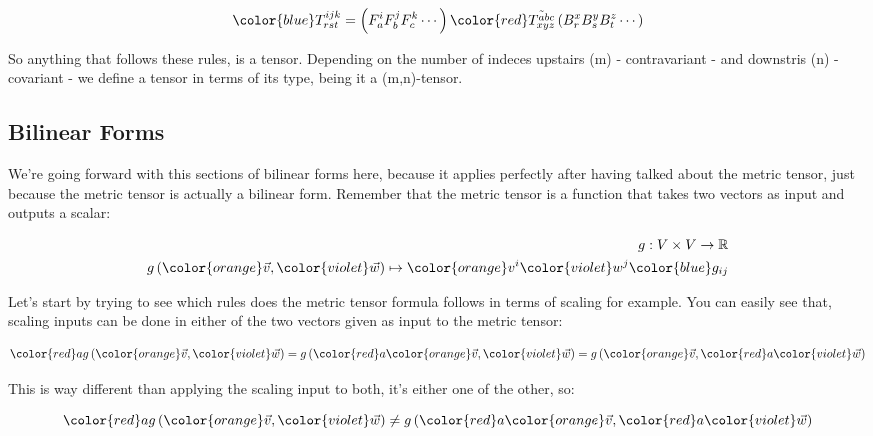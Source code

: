 \begin{equation}
    \begingroup\color{blue} T^{ijk}_{rst}\endgroup = \left(F^i_a F^j_b F^k_c \cdots\right)\begingroup\color{red}\tilde{T^{abc}_{xyz}}\endgroup \left(B^x_r B^y_s B^z_t \cdots\right)
\end{equation}

So anything that follows these rules, is a tensor.
Depending on the number of indeces upstairs (m) - contravariant - and downstris (n) - covariant - we define a tensor in terms of its type, 
being it a (m,n)-tensor.

\subsection{Bilinear Forms}

We're going forward with this sections of bilinear forms here, because it applies perfectly after having talked about the metric tensor, 
just because the metric tensor is actually a bilinear form.
Remember that the metric tensor is a function that takes two vectors as input and outputs a scalar:

\begin{align*}
    g: V \times V \to \mathbb{R}\\
    g \left(\begingroup\color{orange}\vec{v}\endgroup, \begingroup\color{violet}\vec{w}\endgroup\right) \mapsto  \begingroup\color{orange}v^i\endgroup \begingroup\color{violet}w^j\endgroup \begingroup\color{blue}g_{ij}\endgroup
\end{align*}

Let's start by trying to see which rules does the metric tensor formula follows in terms of scaling for example.
You can easily see that, scaling inputs can be done in either of the two vectors given as input to the metric tensor:

\begin{align*}
    \begingroup\color{red}a \endgroup g \left(\begingroup\color{orange}\vec{v}\endgroup, \begingroup\color{violet}\vec{w}\endgroup\right)
    = g \left(\begingroup\color{red}a \endgroup\begingroup\color{orange}\vec{v}\endgroup, \begingroup\color{violet}\vec{w}\endgroup\right)
    = g \left(\begingroup\color{orange}\vec{v}\endgroup, \begingroup\color{red}a \endgroup\begingroup\color{violet}\vec{w}\endgroup\right)
\end{align*}

This is way different than applying the scaling input to both, it's either one of the other, so:

\begin{equation}
    \begingroup\color{red}a \endgroup g \left(\begingroup\color{orange}\vec{v}\endgroup, \begingroup\color{violet}\vec{w}\endgroup\right)
    \neq g  \left(\begingroup\color{red}a \endgroup\begingroup\color{orange}\vec{v}\endgroup, \begingroup\color{red}a \endgroup\begingroup\color{violet}\vec{w}\endgroup\right)
\end{equation}

